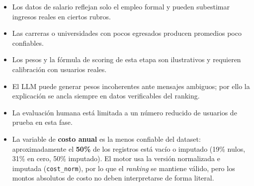 \begin{itemize}[noitemsep]
  \item Los datos de salario reflejan solo el empleo formal y pueden subestimar
        ingresos reales en ciertos rubros.
  \item Las carreras o universidades con pocos egresados producen promedios poco
        confiables.
  \item Los pesos y la f\'ormula de scoring de esta etapa son ilustrativos y
        requieren calibraci\'on con usuarios reales.
  \item El LLM puede generar pesos incoherentes ante mensajes ambiguos; por ello
        la explicaci\'on se ancla siempre en datos verificables del ranking.
  \item La evaluaci\'on humana est\'a limitada a un n\'umero reducido de usuarios
        de prueba en esta fase.
  \item La variable de \textbf{costo anual} es la menos confiable del dataset:
        aproximadamente el \textbf{50\%} de los registros est\'a vac\'io o imputado
        (19\% nulos, 31\% en cero, 50\% imputado). El motor usa la versi\'on
        normalizada e imputada (\texttt{cost\_norm}), por lo que el \emph{ranking}
        se mantiene v\'alido, pero los montos absolutos de costo no deben
        interpretarse de forma literal.
\end{itemize}
